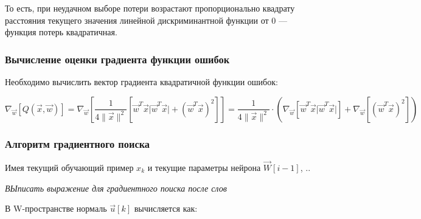 \documentclass[a4paper]{article}
\numberwithin{equation}{subsection}
\begin{document}
То есть, при неудачном выборе потери возрастают пропорционально квадрату расстояния 
текущего значения линейной дискриминантной функции от 0 --- функция потерь
квадратичная. 




\subsubsection{Вычисление оценки градиента функции ошибок}

Необходимо вычислить вектор градиента квадратичной функции ошибок:

\begin{equation}
    \nabla_{\vec{w}} \left[ Q\left( \vec{x}, \vec{w} \right) \right] =
    \nabla_{\vec{w}} 
    \left[ 
        \dfrac{1}{4 \| \vec{x} \| ^2 } 
        \left[
            \vec{w}^T \vec{x} \lvert \vec{w}^T \vec{x} \rvert +
            \left( \vec{w}^T \vec{x} \right)^2
        \right] 
    \right] =
    \dfrac{1}{4 \| \vec{x} \| ^2 } \cdot
    \left(
        \nabla_{\vec{w}}
        \left[
            \vec{w}^T \vec{x} \lvert \vec{w}^T \vec{x} \rvert
        \right] +
        \nabla_{\vec{w}}
        \left[
            \left( \vec{w}^T \vec{x} \right)^2
        \right]
    \right)
\end{equation}






\subsubsection{Алгоритм градиентного поиска}


Имея текущий обучающий пример $x_k$ и текущие параметры нейрона $\vec{W}[i-1]$,
..

\begin{myquote}
    \textit{ВЫписать выражение для градиентного поиска после слов}
\end{myquote}

В W-пространстве нормаль $\vec{u}[k]$ вычисляется как: 
\end{document}
